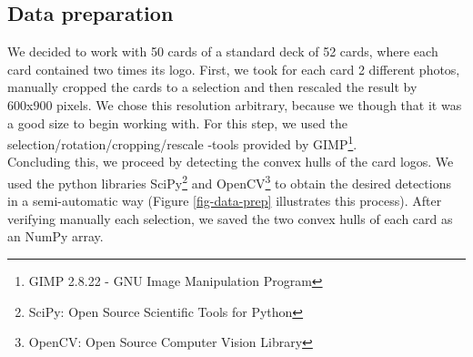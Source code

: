 \documentclass[a4paper]{article}
\begin{document}
\subsection{Data preparation}
We decided to work with 50 cards of a standard deck of 52 cards, where each card contained two times its logo.  First, we took for each card 2 different photos, manually cropped the cards to a selection and then rescaled the result by 600x900 pixels.  We chose this resolution arbitrary, because we though that it was a good size to begin working with.
For this step, we used the selection/rotation/cropping/rescale -tools provided by GIMP\footnote{GIMP 2.8.22 - GNU Image Manipulation Program}. \\
Concluding this, we proceed by detecting the convex hulls of the card logos.   We used the python libraries SciPy\footnote{SciPy: Open Source Scientific Tools for Python} and OpenCV\footnote{OpenCV: Open Source Computer Vision Library} to obtain the desired detections in a semi-automatic way (Figure \ref{fig-data-prep} illustrates this process).  After verifying manually each selection, we saved the two convex hulls of each card as an NumPy array. \\
\end{document}
